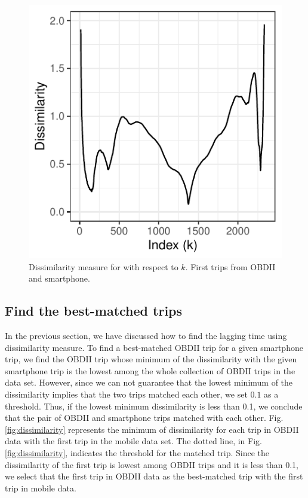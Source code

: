 \documentclass[letterpaper,9pt,twocolumn,twoside,]{pinp}
\begin{document}
\begin{figure}

{\centering \includegraphics{report_issaclee_files/figure-latex/laggedtime-1} 

}

\caption{Dissimilarity measure for with respect to $k$. First trips from OBDII and smartphone.}\label{fig:laggedtime}
\end{figure}

\hypertarget{find-the-best-matched-trips}{%
\subsection{Find the best-matched
trips}\label{find-the-best-matched-trips}}

In the previous section, we have discussed how to find the lagging time
using dissimilarity measure. To find a best-matched OBDII trip for a
given smartphone trip, we find the OBDII trip whose minimum of the
dissimilarity with the given smartphone trip is the lowest among the
whole collection of OBDII trips in the data set. However, since we can
not guarantee that the lowest minimum of the dissimilarity implies that
the two trips matched each other, we set \(0.1\) as a threshold. Thus,
if the lowest minimum dissimilarity is less than 0.1, we conclude that
the pair of OBDII and smartphone trips matched with each other. Fig.
\ref{fig:dissimilarity} represents the minimum of dissimilarity for each
trip in OBDII data with the first trip in the mobile data set. The
dotted line, in Fig. \ref{fig:dissimilarity}, indicates the threshold
for the matched trip. Since the dissimilarity of the first trip is
lowest among OBDII trips and it is less than 0.1, we select that the
first trip in OBDII data as the best-matched trip with the first trip in
mobile data.
\end{document}
